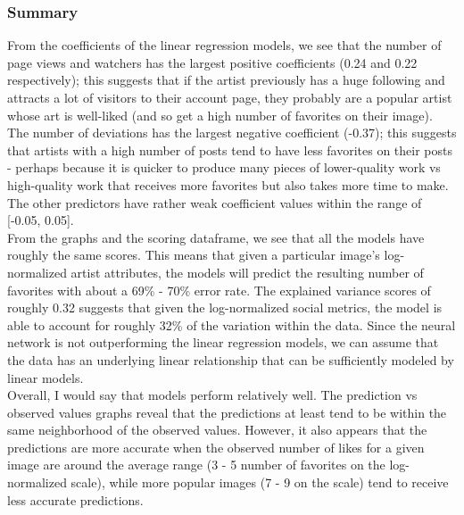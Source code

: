 \documentclass[11pt]{article}
\begin{document}
    \begin{center}
    \end{center}
            
    \subsubsection{Summary}

From the coefficients of the linear regression models, we see that the
number of page views and watchers has the largest positive coefficients
(0.24 and 0.22 respectively); this suggests that if the artist
previously has a huge following and attracts a lot of visitors to their
account page, they probably are a popular artist whose art is well-liked
(and so get a high number of favorites on their image). The number of
deviations has the largest negative coefficient (-0.37); this suggests
that artists with a high number of posts tend to have less favorites on
their posts - perhaps because it is quicker to produce many pieces of
lower-quality work vs high-quality work that receives more favorites but
also takes more time to make.\\

The other predictors have rather weak coefficient values within the
range of {[}-0.05, 0.05{]}.\\

From the graphs and the scoring dataframe, we see that all the models
have roughly the same scores. This means that given a particular image's
log-normalized artist attributes, the models will predict the resulting
number of favorites with about a 69\% - 70\% error rate. The explained
variance scores of roughly 0.32 suggests that given the log-normalized
social metrics, the model is able to account for roughly 32\% of the
variation within the data. Since the neural network is not outperforming
the linear regression models, we can assume that the data has an
underlying linear relationship that can be sufficiently modeled by
linear models.\\

Overall, I would say that models perform relatively well. The prediction
vs observed values graphs reveal that the predictions at least tend to
be within the same neighborhood of the observed values. However, it also
appears that the predictions are more accurate when the observed number
of likes for a given image are around the average range (3 - 5 number of
favorites on the log-normalized scale), while more popular images (7 - 9
on the scale) tend to receive less accurate predictions.\\
\end{document}

